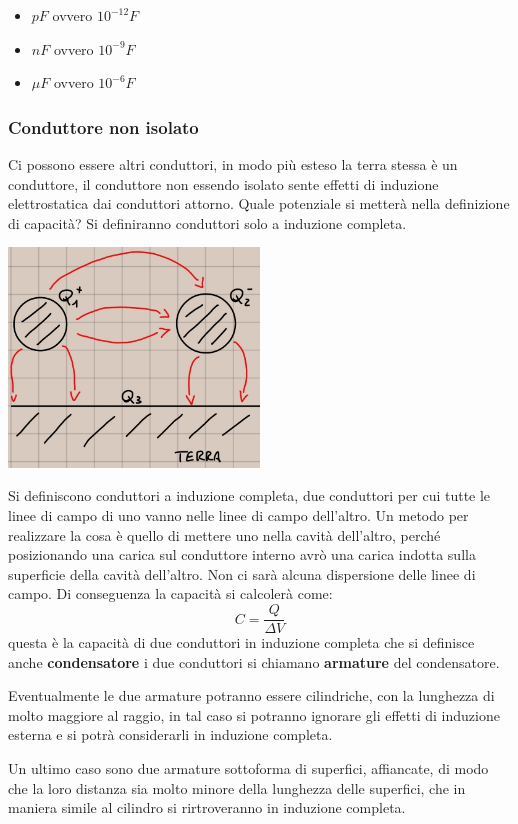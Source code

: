 \documentclass[a4paper, 12pt]{book}
\theoremstyle{plain}
\begin{document}
\begin{itemize}
    \item $pF$ ovvero $10^{-12}F$
    \item $nF$ ovvero $10^{-9}F$
    \item $\mu F$ ovvero $10^{-6}F$
\end{itemize}

\subsubsection{Conduttore non isolato}

Ci possono essere altri conduttori, in modo più esteso 
la terra stessa è un conduttore, il conduttore non essendo 
isolato sente effetti di induzione elettrostatica dai 
conduttori attorno. Quale potenziale si metterà nella 
definizione di capacità? Si definiranno conduttori solo 
a induzione completa.

\includegraphics[width=0.5\textwidth]{cond_terra.jpg}

Si definiscono conduttori a induzione completa, due conduttori 
per cui tutte le linee di campo di uno vanno nelle 
linee di campo dell'altro. Un metodo per realizzare 
la cosa è quello di mettere uno nella cavità 
dell'altro, perché posizionando una carica sul conduttore 
interno avrò una carica indotta sulla superficie della 
cavità dell'altro. Non ci sarà alcuna dispersione delle
linee di campo. Di conseguenza la capacità si calcolerà 
come: \[ C = \frac{Q}{\Delta V} \] questa è la capacità
di due conduttori in induzione completa che si definisce 
anche \textbf{condensatore} i due conduttori si chiamano
\textbf{armature} del condensatore. 

Eventualmente le 
due armature potranno essere cilindriche, con la lunghezza 
di molto maggiore al raggio, in tal caso si potranno ignorare 
gli effetti di induzione esterna e si potrà considerarli 
in induzione completa.

Un ultimo caso sono due armature 
sottoforma di superfici, affiancate, di modo che la loro 
distanza sia molto minore della lunghezza delle superfici, 
che in maniera simile al cilindro si rirtroveranno in 
induzione completa.
\end{document}
